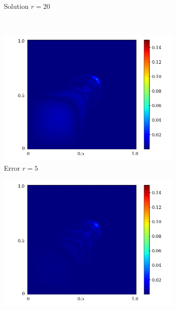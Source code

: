 \begin{figure}[ht!]
\begin{center}
\begin{subfigure}[b]{0.20\textwidth}
\begin{center}
            \end{center}
            \caption{Solution $r = 20$}
        \end{subfigure}\\  
        \begin{subfigure}[b]{0.20\textwidth}
            \begin{center}
                \includegraphics[trim = {0, 0, 3cm, 0}, clip, width=\textwidth]{Pictures/X-rom-LE-DAE-5-abs-err.png}
            \end{center}
            \caption{Error $r = 5$}
        \end{subfigure}  
        \begin{subfigure}[b]{0.20\textwidth}
            \begin{center}
                \includegraphics[trim = {0, 0, 3cm, 0}, clip, width=\textwidth]{Pictures/X-rom-LE-DAE-10-abs-err.png}

\end{center}
\end{subfigure}
\end{center}
\end{figure}
